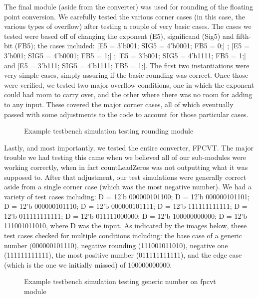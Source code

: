 \documentclass{article}
\begin{document}
The final module (aside from the converter) was used for rounding of the floating point conversion.  We carefully tested the various corner cases (in this case, the various types of overflow) after testing a couple of very basic cases.  The cases we tested were based off of changing the exponent (E5), significand (Sig5) and fifth-bit (FB5); the cases included: [E5 = 3'b001; SIG5 = 4'b0001; FB5 = 0;] ; [E5 = 3'b001; SIG5 = 4'b0001; FB5 = 1;] ; [E5 = 3'b001; SIG5 = 4'b1111; FB5 = 1;] and [E5 = 3'b111; SIG5 = 4'b1111; FB5 = 1;].  The first two instantiations were very simple cases, simply assuring if the basic rounding was correct.  Once those were verified, we tested two major overflow conditions, one in which the exponent could had room to carry over, and the other where there was no room for adding to any input.  These covered the major corner cases, all of which eventually passed with some adjustments to the code to account for those particular cases. 

\begin{figure}[H]
	\begin{center}
		\caption{Example testbench simulation testing rounding module}
	\end{center}
\end{figure}

Lastly, and most importantly, we tested the entire converter, FPCVT.  The major trouble we had testing this came when we believed all of our sub-modules were working correctly, when in fact countLeadZeros was not outputting what it was supposed to.  After that adjustment, our test simulations were generally correct aside from a single corner case (which was the most negative number).  We had a variety of test cases including: D = 12'b 000000101100; D = 12'b 000000101101; D = 12'b 000000101110; D = 12'b 000000101111; D = 12'b 111111111111; D = 12'b 011111111111; D = 12'b 011111000000; D = 12'b 100000000000; D = 12'b 111001011010, where D was the input.  As indicated by the images below, these test cases checked for multiple conditions including: the base case of a generic number (000000101110), negative rounding (111001011010), negative one (111111111111), the most positive number (011111111111), and the edge case (which is the one we initially missed) of 100000000000. 

\begin{figure}[H]
	\begin{center}
		\caption{Example testbench simulation testing generic number on fpcvt module}
	\end{center}
\end{figure}
\end{document}
